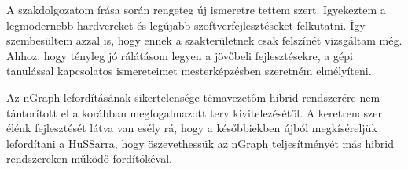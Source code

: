 A szakdolgozatom írása során rengeteg új ismeretre tettem szert. Igyekeztem a legmodernebb hardvereket és legújabb szoftverfejlesztéseket felkutatni. Így szembesültem azzal is, hogy ennek a szakterületnek csak felszínét vizsgáltam még. Ahhoz, hogy tényleg jó rálátásom legyen a jövőbeli fejlesztésekre, a gépi tanulással kapcsolatos ismereteimet mesterképzésben szeretném elmélyíteni.

Az nGraph lefordításának sikertelensége témavezetőm hibrid rendszerére nem tántorított el a korábban megfogalmazott terv kivitelezésétől. A keretrendszer élénk fejlesztését látva van esély rá, hogy a későbbiekben újból megkíséreljük lefordítani a HuSSarra, hogy öszevethessük az nGraph teljesítményét más hibrid rendszereken működő fordítókéval.